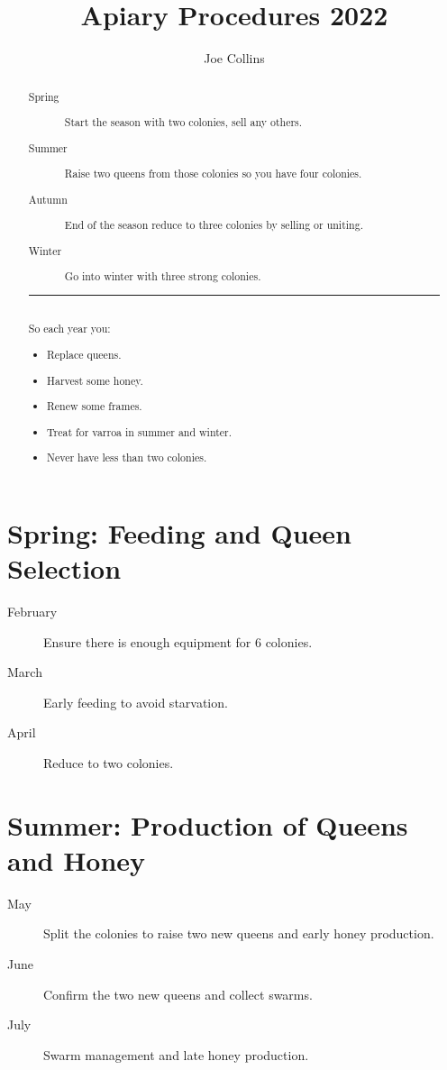 \documentclass{./BeekeepingBook}
\title{Apiary Procedures 2022}
\author{Joe Collins}
\begin{document}
\maketitle

\begin{abstract}


  \begin{description}
    \item[Spring] Start the season with two colonies, sell any others.
    \item[Summer] Raise two queens from those colonies so you have four colonies.
    \item[Autumn] End of the season reduce to three colonies by selling or uniting.
    \item[Winter] Go into winter with three strong colonies. 
  \end{description}

  \vfill
  \rule{8cm}{0.4pt}\\
  So each year you:
  \begin{itemize}
    \item Replace queens.
    \item Harvest some honey. 
    \item Renew some frames.
    \item Treat for varroa in summer and winter.
    \item Never have less than two colonies.
  \end{itemize}

\end{abstract}

\clearpage
\tableofcontents

\clearpage
\section{Spring: Feeding and Queen Selection}
\begin{description}
  \item[February] Ensure there is enough equipment for 6 colonies.
  \item[March] Early feeding to avoid starvation.
  \item[April] Reduce to two colonies.
\end{description}




\clearpage
\section{Summer: Production of Queens and Honey}
\begin{description}
  \item[May] Split the colonies to raise two new queens and early honey production.
  \item[June] Confirm the two new queens and collect swarms.
  \item[July] Swarm management and late honey production.
\end{description}



\end{document}
